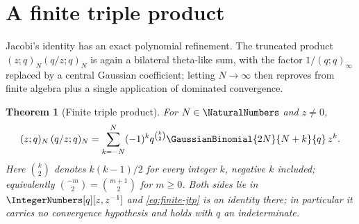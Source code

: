 \documentclass[11pt,a4paper,oneside,openany]{book}
\newtheorem{theorem}{Theorem}[chapter]
\theoremstyle{definition}
\theoremstyle{remark}
\begin{document}
\section{A finite triple product}

Jacobi's identity has an exact polynomial refinement.  The truncated product $(z;q)_N(q/z;q)_N$ is again a bilateral theta-like sum, with the factor $1/(q;q)_\infty$ replaced by a central Gaussian coefficient; letting $N\to\infty$ then reproves  from finite algebra plus a single application of dominated convergence.

\begin{theorem}[Finite triple product]\label{thm:finite-jtp}
For $N\in\NaturalNumbers$ and $z\ne0$,
\begin{equation}
 (z;q)_N\,(q/z;q)_N
 =\sum_{k=-N}^{N}(-1)^k q^{\binom k2}
 \GaussianBinomial{2N}{N+k}{q}\,z^{k}.
 \label{eq:finite-jtp}
\end{equation}
Here $\binom k2$ denotes $k(k-1)/2$ for every integer $k$, negative $k$ included; equivalently $\binom{-m}{2}=\binom{m+1}{2}$ for $m\ge0$.
Both sides lie in $\IntegerNumbers[q][z,z^{-1}]$ and \eqref{eq:finite-jtp} is an identity there; in particular it carries no convergence hypothesis and holds with $q$ an indeterminate.
\end{theorem}
\end{document}
